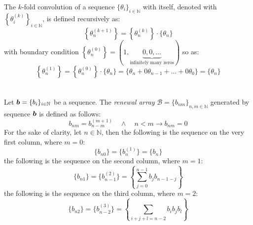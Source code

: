 The $k$-fold convolution of a sequence $\lbrace
\theta_{i}\rbrace_{i\in\mathbb{N}}$ 
with itself, denoted with  $\left\lbrace
\theta_{i}^{(k)}\right\rbrace_{i\in\mathbb{N}}$, is defined recursively as:
\begin{displaymath}
    \left\lbrace\theta_{n}^{(k+1)}\right\rbrace= \left\lbrace\theta_{n}^{(k)}\right\rbrace\cdot
        \lbrace\theta_{n}\rbrace
\end{displaymath}
with boundary condition $\left\lbrace\theta_{n}^{(0)}\right\rbrace=(1,\underbrace{0,0,\ldots}_{\text{infinitely many zeros}})$ so as:
\begin{displaymath}
    \left\lbrace\theta_{n}^{(1)}\right\rbrace= \left\lbrace\theta_{n}^{(0)}\right\rbrace\cdot
        \lbrace\theta_{n}\rbrace=
        \lbrace\theta_{n}+0\theta_{n-1}+\ldots+0\theta_{0}\rbrace=
        \lbrace\theta_{n}\rbrace
\end{displaymath}
\\\\
Let $\boldsymbol{b}=\lbrace b_{i}\rbrace_{i\in\mathbb{N}}$ be a sequence. 
The \emph{renewal array} 
$\mathcal{B}=\lbrace b_{nm}\rbrace_{n,m\in\mathbb{N}}$
generated by sequence $\boldsymbol{b}$ is defined as follows:
\begin{displaymath}
    b_{nm}=b_{n-m}^{(m+1)} \quad\wedge\quad n < m\rightarrow b_{nm}=0
\end{displaymath}
For the sake of clarity, let $n\in\mathbb{N}$, then
the following is the sequence on the very first column, where $m=0$:
\begin{displaymath}
    \lbrace b_{n0}\rbrace
        =\lbrace b_{n}^{(1)}\rbrace
        =\lbrace b_{n}\rbrace
\end{displaymath}
the following is the sequence on the second column, where $m=1$:
\begin{displaymath}
    \lbrace b_{n1}\rbrace
        =\lbrace b_{n-1}^{(2)}\rbrace
        =\left\lbrace \sum_{j=0}^{n-1}{b_{j}b_{n-1-j}}\right\rbrace
\end{displaymath}
the following is the sequence on the third column, where $m=2$:
\begin{displaymath}
    \lbrace b_{n2}\rbrace
        =\lbrace b_{n-2}^{(3)}\rbrace
        =\left\lbrace \sum_{i+j+l=n-2}{b_{i}b_{j}b_{l}}\right\rbrace
\end{displaymath}
